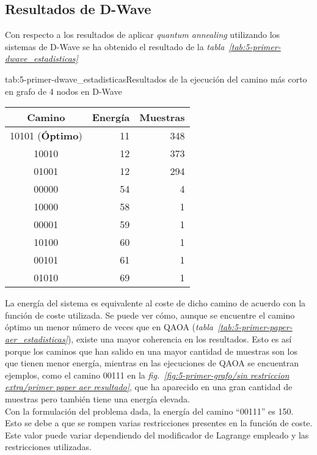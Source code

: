 \subsection{Resultados de D-Wave}

Con respecto a los resultados de aplicar \textit{quantum annealing} utilizando los sistemas de D-Wave se ha obtenido el resultado de la \textit{tabla~\ref{tab:5-primer-dwave_estadisticas}}

\begin{table}[Resultados D-Wave {--} artículo de Urgelles \textit{et al.} (2022)]{tab:5-primer-dwave_estadisticas}{Resultados de la ejecución del camino más corto en grafo de 4 nodos en D-Wave}
  \centering
  \begin{tabular}{|c|r|r|}
    \hline
    \textbf{Camino}         & \textbf{Energía} & \textbf{Muestras} \\ \hline
    10101 (\textbf{Óptimo}) & 11               & 348               \\ \hline
    10010                   & 12               & 373               \\ \hline
    01001                   & 12               & 294               \\ \hline
    00000                   & 54               &   4               \\ \hline
    10000                   & 58               &   1               \\ \hline
    00001                   & 59               &   1               \\ \hline
    10100                   & 60               &   1               \\ \hline
    00101                   & 61               &   1               \\ \hline
    01010                   & 69               &   1               \\ \hline
  \end{tabular}
\end{table}

La energía del sistema es equivalente al coste de dicho camino de acuerdo con la función de coste utilizada.
Se puede ver cómo, aunque se encuentre el camino óptimo un menor número de veces que en QAOA (\textit{tabla~\ref{tab:5-primer-paper-aer_estadisticas}}), existe una mayor coherencia en los resultados.
Esto es así porque los caminos que han salido en una mayor cantidad de muestras son los que tienen menor energía, mientras en las ejecuciones de QAOA se encuentran ejemplos, como el camino 00111 en la
\textit{fig.~\ref{fig:5-primer-grafo/sin restriccion extra/primer paper aer resultado}}, que ha aparecido en una gran cantidad de muestras pero también tiene una energía elevada.
\\
Con la formulación del problema dada, la energía del camino ``00111'' es 150.
Esto se debe a que se rompen varias restricciones presentes en la función de coste.
Este valor puede variar dependiendo del modificador de Lagrange empleado y las restricciones utilizadas.

